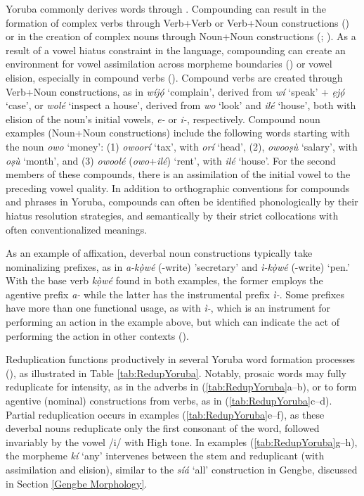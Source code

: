 \documentclass[output=paper,colorlinks,citecolor=brown]{langscibook}
\begin{document}
Yoruba commonly derives words through . Compounding can result in the formation of complex verbs through Verb+Verb or Verb+Noun constructions (\citealt{SchleicherandSchleicher1990, Seidl2000}) or in the creation of complex nouns through Noun+Noun constructions (\citealt{Adewole1995}; \citealt{Eleshin2021}). As a result of a vowel hiatus constraint in the language, compounding can create an environment for vowel assimilation across morpheme boundaries (\citealt{Adewole1995}) or vowel elision, especially in compound verbs (\citealt{SchleicherandSchleicher1990, Seidl2000}). Compound verbs are created through Verb+Noun constructions, as in \textit{wíjọ́} ‘complain', derived from \textit{wí} ‘speak’ + \textit{ẹjọ́} ‘case', or \textit{wolé} ‘inspect a house', derived from \textit{wo} ‘look’ and \textit{ilé} ‘house', both with elision of the noun’s initial vowels, \textit{e-} or \textit{i-}, respectively. Compound noun examples (Noun+Noun constructions) include the following words starting with the noun \textit{owo} ‘money’: (1) \textit{owoorí} ‘tax', with \textit{orí} ‘head', (2), \textit{owooṣù} ‘salary', with \textit{oṣù} ‘month', and (3) \textit{owoolé} (\textit{owo}+\textit{ilé}) ‘rent', with \textit{ilé} ‘house'. For the second members of these compounds, there is an assimilation of the initial vowel to the preceding vowel quality. In addition to orthographic conventions for compounds and phrases in Yoruba, compounds can often be identified phonologically by their hiatus resolution strategies, and semantically by their strict collocations with often conventionalized meanings. 

As an example of affixation, deverbal noun constructions typically take nominalizing prefixes, as in \textit{a-kọ̀wé} (-write) 'secretary' and \textit{ì-kọ̀wé} (-write) `pen.' With the base verb \textit{kọ̀wé} found in both examples, the former employs the agentive prefix \textit{a-} while the latter has the instrumental prefix \textit{ì-}. Some prefixes have more than one functional usage, as with \textit{ì-}, which is an instrument for performing an action in the example above, but which can indicate the act of performing the action in other contexts (\citealt{Adewole1995, Awobuluyi2008, Bamgbose1990}). 

Reduplication  functions productively in several Yoruba word formation processes (\citealt{Ehineni2017, Pulleyblank2009}), as illustrated in Table \ref{tab:RedupYoruba}. Notably, prosaic words may fully reduplicate for intensity, as in the adverbs in (\ref{tab:RedupYoruba}a--b), or to form agentive (nominal) constructions from verbs, as in (\ref{tab:RedupYoruba}c--d). Partial reduplication occurs in examples (\ref{tab:RedupYoruba}e--f), as these deverbal nouns reduplicate only the first consonant of the word, followed invariably by the vowel /i/ with High tone. In examples (\ref{tab:RedupYoruba}g--h), the morpheme \textit{kí} ‘any’ intervenes between the stem and reduplicant (with assimilation and elision), similar to the \textit{síá} ‘all’ construction in Gengbe, discussed in Section \ref{Gengbe Morphology}.
\end{document}
